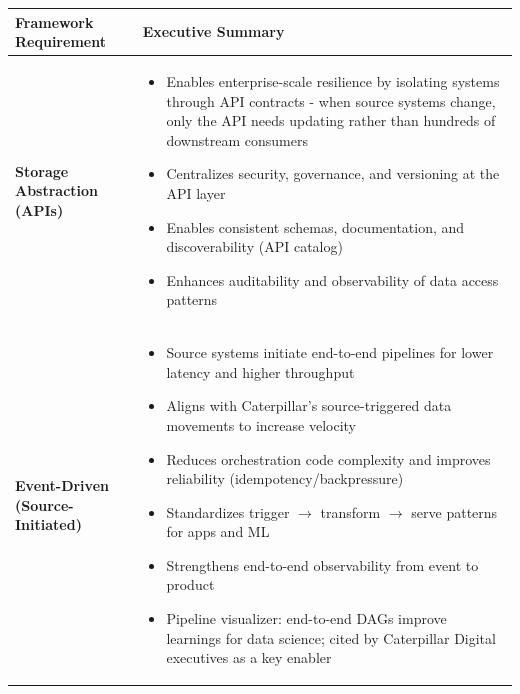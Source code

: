 \documentclass[12pt, a4paper]{article}
\begin{document}
\begin{table}[h!]
\centering
\renewcommand{\arraystretch}{1.3}
\begin{tabularx}{\textwidth}{@{}
  >{\raggedright\arraybackslash\relax}p{2.8cm}
  X@{}}
\toprule
\textbf{Framework Requirement} & \textbf{Executive Summary} \\
\midrule

\textbf{Storage Abstraction (APIs)} &
\begin{itemize}[leftmargin=*, nosep]
  \item Enables enterprise-scale resilience by isolating systems through API contracts - when source systems change, only the API needs updating rather than hundreds of downstream consumers
  \item Centralizes security, governance, and versioning at the API layer
  \item Enables consistent schemas, documentation, and discoverability (API catalog)
  \item Enhances auditability and observability of data access patterns
\end{itemize} \\
\midrule

\textbf{Event-Driven (Source-Initiated)} &
\begin{itemize}[leftmargin=*, nosep]
  \item Source systems initiate end-to-end pipelines for lower latency and higher throughput
  \item Aligns with Caterpillar’s source-triggered data movements to increase velocity
  \item Reduces orchestration code complexity and improves reliability (idempotency/backpressure)
  \item Standardizes trigger $\rightarrow$ transform $\rightarrow$ serve patterns for apps and ML
  \item Strengthens end-to-end observability from event to product
  \item Pipeline visualizer: end-to-end DAGs improve learnings for data science; cited by Caterpillar Digital executives as a key enabler
\end{itemize} \\
\midrule


\end{tabularx}
\end{table}
\end{document}
